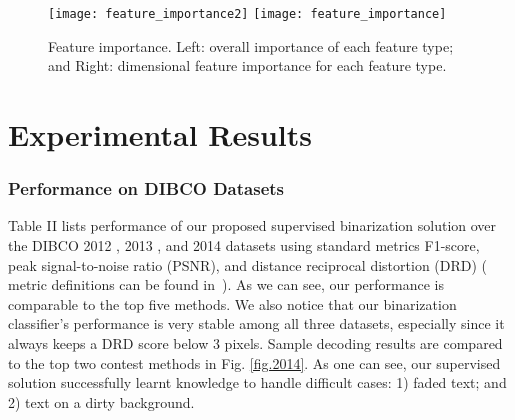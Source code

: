 \documentclass[onecolumn,11pt,draftcls,journal]{IEEEtran}
\def\citeDIBCO{\cite{DIBCO2009,DIBCO2010,DIBCO2011,DIBCO2012,DIBCO2013,DIBCO2014}\,}
\begin{document}
\begin{figure}[!h]
\centering
\scriptsize
\texttt{[image: feature\_importance2]}
\texttt{[image: feature\_importance]}
\caption{Feature importance. Left: overall importance of each feature type; and Right: dimensional feature importance for each feature type. }
\label{fig.importance}
\end{figure}
\section{Experimental Results}\setcounter{subsubsection}{0}
\subsubsection{Performance on DIBCO Datasets}
Table II lists performance of our proposed supervised binarization solution over the DIBCO 2012 \cite{DIBCO2012}, 2013 \cite{DIBCO2013}, and 2014 \cite{DIBCO2014} datasets using standard metrics F1-score, peak signal-to-noise ratio (PSNR), and distance reciprocal distortion (DRD) ( metric definitions can be found in  \citeDIBCO). As we can see, our performance is comparable to the top five methods. We also notice that our binarization classifier's performance is very stable among all three datasets, especially since it always keeps a DRD score below 3 pixels. Sample decoding results are compared to the top two contest methods in Fig. \ref{fig.2014}. As one can see, our supervised solution successfully learnt knowledge to handle difficult cases: 1) faded text; and 2) text on a dirty background.  
\end{document}

